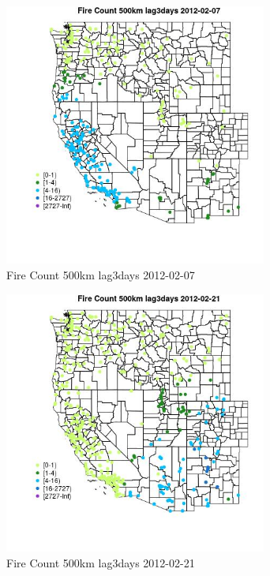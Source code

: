 \begin{figure} 
\centering  
\includegraphics[width=0.77\textwidth]{Code_Outputs/Report_ML_input_PM25_Step4_part_f_de_duplicated_aveswNAs_MapObsFire_Count_500km_lag3days2012-02-07.jpg} 
\caption{\label{fig:Report_ML_input_PM25_Step4_part_f_de_duplicated_aveswNAsMapObsFire_Count_500km_lag3days2012-02-07}Fire Count 500km lag3days 2012-02-07} 
\end{figure} 
 

\begin{figure} 
\centering  
\includegraphics[width=0.77\textwidth]{Code_Outputs/Report_ML_input_PM25_Step4_part_f_de_duplicated_aveswNAs_MapObsFire_Count_500km_lag3days2012-02-21.jpg} 
\caption{\label{fig:Report_ML_input_PM25_Step4_part_f_de_duplicated_aveswNAsMapObsFire_Count_500km_lag3days2012-02-21}Fire Count 500km lag3days 2012-02-21} 
\end{figure} 
 


